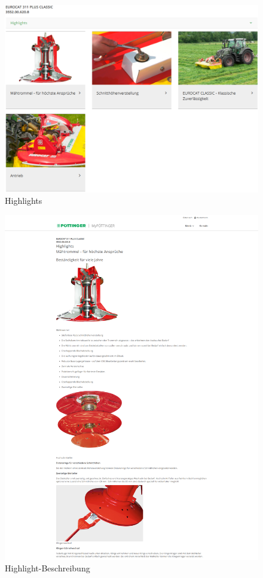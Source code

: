 \begin{figure}[H]
	\centerline{
		\includegraphics[width=1\textwidth]{./grafiken/erm_detailansicht_highlights.PNG}
	}
	\vskip0pt
	\caption{Highlights} \label{fig:highlight}
\end{figure}

\begin{figure}[H]
	\centerline{
		\includegraphics[width=1\textwidth]{./grafiken/erm_detailansicht_highlights_beschreibung.PNG}
	}
	\vskip0pt
	\caption{Highlight-Beschreibung} \label{fig:highlightbeschreibung}
\end{figure}

